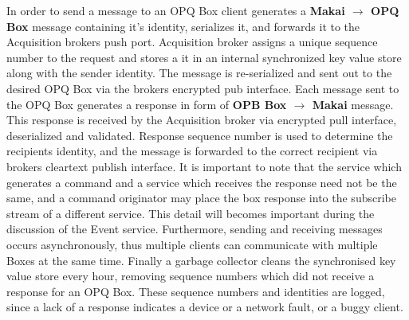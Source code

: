In order to send a message to an OPQ Box client generates a \textbf{Makai $\rightarrow$ OPQ Box} message containing it's identity, serializes it, and forwards it to the Acquisition brokers push port.
Acquisition broker assigns a unique sequence number to the request and stores a it in an internal synchronized key value store along with the sender identity.
The message is re-serialized and sent out to the desired OPQ Box via the brokers encrypted pub interface.
Each message sent to the OPQ Box generates a response in form of \textbf{OPB Box $\rightarrow$ Makai} message.
This response is received by the Acquisition broker via encrypted pull interface, deserialized and validated.
Response sequence number is used to determine the recipients identity, and the message is forwarded to the correct recipient via brokers cleartext publish interface.
It is important to note that the service which generates a command and a service which receives the response need not be the same, and a command originator may place the box response into the subscribe stream of a different service.
This detail will becomes important during the discussion of the Event service.
Furthermore, sending and receiving messages occurs asynchronously, thus multiple clients can communicate with multiple Boxes at the same time.
Finally a garbage collector cleans the synchronised key value store every hour, removing sequence numbers which did not receive a response for an OPQ Box.
These sequence numbers and identities are logged, since a lack of a response indicates a device or a network fault, or a buggy client.

